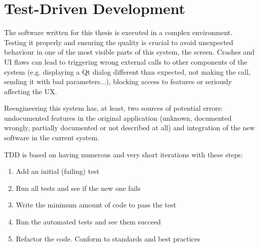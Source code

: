 

\section{Test-Driven Development}
The software written for this thesis is executed in a complex environment.
Testing it properly and ensuring the quality is crucial to avoid unexpected behaviour in one of the most visible parts of this system, the screen.
Crashes and \ac{UI} flaws can lead to triggering wrong external calls to other components of the system (e.g. displaying a Qt dialog different than expected, not making the call, sending it with bad parameters...), blocking access to features or seriously affecting the \ac{UX}.

Reengineering this system has, at least, two sources of potential errors: 
undocumented features in the original application (unknown, documented wrongly, partially documented or not described at all) and integration of the new software in the current system.

\ac{TDD} is based on having numerous and very short iterations with these steps:
\begin{enumerate}
    \item Add an initial (failing) test
    \item Run all tests and see if the new one fails
    \item Write the minimum amount of code to pass the test
    \item Run the automated tests and see them succeed
    \item Refactor the code. Conform to standards and best practices
\end{enumerate}

